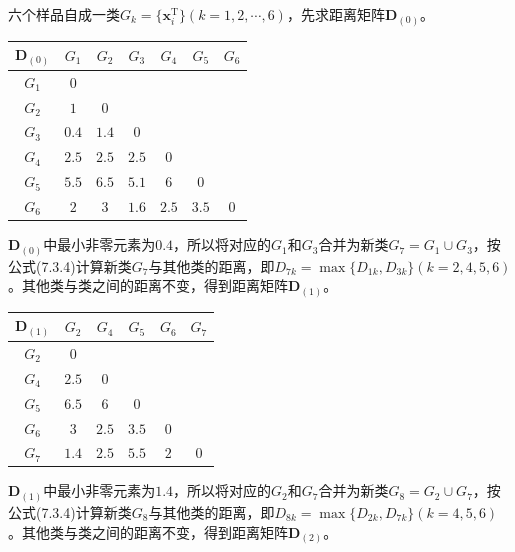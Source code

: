 \begin{enumerate}
\begin{enumerate}[label=(\arabic*)]
            六个样品自成一类$G_k=\{\pmb{x}_i^{\mathrm{T}}\}(k=1,2,\cdots,6)$，先求距离矩阵$\pmb{D}_{(0)}$。
            \begin{table}[H]
                \centering
                \begin{tabular}{|c|c|c|c|c|c|c|}
                    \hline
                    $\pmb{D}_{(0)}$ & $G_1$ & $G_2$ & $G_3$ & $G_4$ & $G_5$ & $G_6$ \\ \hline
                    $G_1$ & $0$ & & & & & \\ \hline
                    $G_2$ & $1$ & $0$ & & & & \\ \hline
                    $G_3$ & $\textit{0.4}$ & $1.4$ & $0$ & & & \\ \hline
                    $G_4$ & $2.5$ & $2.5$ & $2.5$ & $0$ & & \\ \hline
                    $G_5$ & $5.5$ & $6.5$ & $5.1$ & $6$ & $0$ & \\ \hline
                    $G_6$ & $2$ & $3$ & $1.6$ & $2.5$ & $3.5$ & $0$ \\ \hline
                \end{tabular}
            \end{table}
            $\pmb{D}_{(0)}$中最小非零元素为$0.4$，所以将对应的$G_1$和$G_3$合并为新类$G_7=G_1 \cup G_3$，按公式(7.3.4)计算新类$G_7$与其他类的距离，即$D_{7k} = \max\{D_{1k},D_{3k}\}(k= 2,4,5,6)$。其他类与类之间的距离不变，得到距离矩阵$\pmb{D}_{(1)}$。
            \begin{table}[H]
                \centering
                \begin{tabular}{|c|c|c|c|c|c|}
                    \hline
                    $\pmb{D}_{(1)}$ & $G_2$ & $G_4$ & $G_5$ & $G_6$ & $G_7$ \\ \hline
                    $G_2$ & $0$ & & & & \\ \hline
                    $G_4$ & $2.5$ & $0$ & & & \\ \hline
                    $G_5$ & $6.5$ & $6$ & $0$ & & \\ \hline
                    $G_6$ & $3$ & $2.5$ & $3.5$ & $0$ & \\ \hline
                    $G_7$ & $\textit{1.4}$ & $2.5$ & $5.5$ & $2$ & $0$ \\ \hline
                \end{tabular}
            \end{table}
            $\pmb{D}_{(1)}$中最小非零元素为$1.4$，所以将对应的$G_2$和$G_7$合并为新类$G_8=G_2 \cup G_7$，按公式(7.3.4)计算新类$G_8$与其他类的距离，即$D_{8k} = \max\{D_{2k},D_{7k}\}(k=4,5,6)$。其他类与类之间的距离不变，得到距离矩阵$\pmb{D}_{(2)}$。

\end{enumerate}
\end{enumerate}
